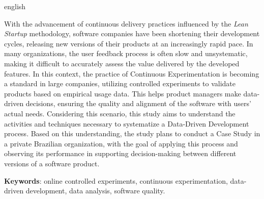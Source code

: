 \begin{resumo}[Abstract]
 \begin{otherlanguage*}{english}

With the advancement of continuous delivery practices influenced by the \textit{Lean Startup} methodology, software companies have been shortening their development cycles, releasing new versions of their products at an increasingly rapid pace. In many organizations, the user feedback process is often slow and unsystematic, making it difficult to accurately assess the value delivered by the developed features. In this context, the practice of Continuous Experimentation is becoming a standard in large companies, utilizing controlled experiments to validate products based on empirical usage data. This helps product managers make data-driven decisions, ensuring the quality and alignment of the software with users' actual needs. Considering this scenario, this study aims to understand the activities and techniques necessary to systematize a Data-Driven Development process. Based on this understanding, the study plans to conduct a Case Study in a private Brazilian organization, with the goal of applying this process and observing its performance in supporting decision-making between different versions of a software product.

\vspace{\onelineskip}

\noindent
\textbf{Keywords}: online controlled experiments, continuous experimentation, data-driven development, data analysis, software quality.

 \end{otherlanguage*}
\end{resumo}
